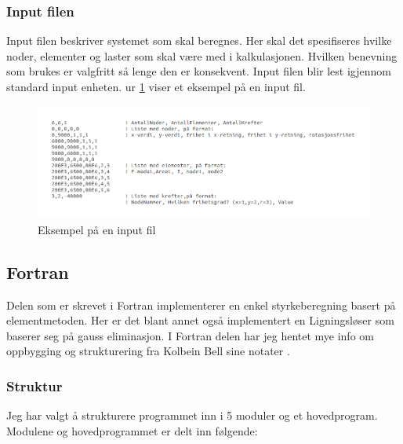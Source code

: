 \documentclass[10pt,a4paper, norsk]{article}
\begin{document}
\subsubsection{Input filen}
Input filen beskriver systemet som skal beregnes. Her skal det spesifiseres hvilke noder, elementer og laster som skal være med i kalkulasjonen. Hvilken benevning som brukes er valgfritt så lenge den er konsekvent. Input filen blir lest igjennom standard input enheten. 
ur \ref{fig:input} viser et eksempel på en input fil.

\begin{figure}[h]
\centering
\includegraphics[scale=0.5]{input.png} 
\caption{Eksempel på en input fil}
\label{fig:input}
\end{figure}


\subsection{Fortran}
Delen som er skrevet i Fortran implementerer en enkel styrkeberegning basert på elementmetoden. Her er det blant annet også implementert en Ligningsløser som baserer seg på gauss eliminasjon. I Fortran delen har jeg hentet mye info om oppbygging og strukturering fra Kolbein Bell sine notater \cite{KolbeinBellFortran} \cite{KolbeinBellProgram}.  


\subsubsection{Struktur}
Jeg har valgt å strukturere programmet inn i 5 moduler og et hovedprogram. Modulene og hovedprogrammet er delt inn følgende:
\end{document}
